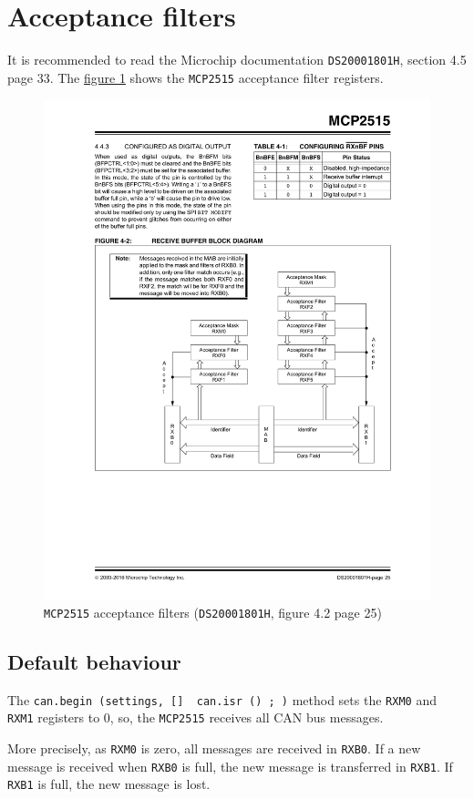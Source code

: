 \documentclass[10pt, a4paper, obeyspaces]{extarticle}
\newcommand \sectionLabel[2]{\section{#1}\label{sec:#2}}
\newcommand \subsectionLabel[2]{\subsection{#1}\label{subsec:#2}}
\newcommand\labelFigure[1]{\label{fig:#1}}
\newcommand\refFigure[2]{\hyperref[fig:#2]{figure \ref*{fig:#2}{\ifthenelse{\equal{#1}{}}{}{.#1}}}}
\begin{document}
\sectionLabel{Acceptance filters}{acceptanceFilters}

It is recommended to read the Microchip documentation \texttt{DS20001801H}, section 4.5 page 33. The \refFigure{}{figureFiltres2515} shows the \texttt{MCP2515} acceptance filter registers.



\begin{figure}[!ht]
  \small
  \centering
  \includegraphics[width=12cm]{mcp2515-filters.pdf}
  \caption{\texttt{MCP2515} acceptance filters (\texttt{DS20001801H}, figure 4.2 page 25)}
  \labelFigure{figureFiltres2515}
\end{figure}








\subsectionLabel{Default behaviour}{defautFilterBehaviour}

The \texttt{can.begin (settings, [] { can.isr () ; })} method sets the \texttt{RXM0} and \texttt{RXM1} registers to $0$, so, the \texttt{MCP2515} receives all CAN bus messages.

More precisely, as \texttt{RXM0} is zero, all messages are received in \texttt{RXB0}. If a new message is received when \texttt{RXB0} is full, the new message is transferred in \texttt{RXB1}. If \texttt{RXB1} is full, the new message is lost.
\end{document}
